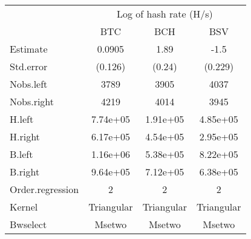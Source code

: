 
\begin{tabular}[t]{lccc}
\toprule
\multicolumn{1}{c}{ } & \multicolumn{3}{c}{Log of hash rate (H/s)} \\
\cmidrule(l{3pt}r{3pt}){2-4}
 & BTC & BCH & BSV\\
\midrule
Estimate & 0.0905 & 1.89 & -1.5\\
Std.error & (0.126) & (0.24) & (0.229)\\
\midrule
Nobs.left & 3789 & 3905 & 4037\\
Nobs.right & 4219 & 4014 & 3945\\
H.left & 7.74e+05 & 1.91e+05 & 4.85e+05\\
H.right & 6.17e+05 & 4.54e+05 & 2.95e+05\\
B.left & 1.16e+06 & 5.38e+05 & 8.22e+05\\
B.right & 9.64e+05 & 7.12e+05 & 6.38e+05\\
Order.regression & 2 & 2 & 2\\
Kernel & Triangular & Triangular & Triangular\\
Bwselect & Msetwo & Msetwo & Msetwo\\
\bottomrule
\end{tabular}
